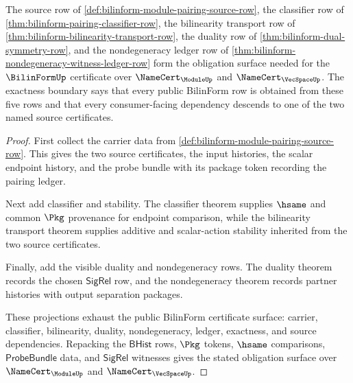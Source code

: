 \begin{theorem}
\label{thm:bilinform-exactness-dependency-row}
The source row of \autoref{def:bilinform-module-pairing-source-row}, the
classifier row of \autoref{thm:bilinform-pairing-classifier-row}, the
bilinearity transport row of
\autoref{thm:bilinform-bilinearity-transport-row}, the duality row of
\autoref{thm:bilinform-dual-symmetry-row}, and the nondegeneracy ledger row
of \autoref{thm:bilinform-nondegeneracy-witness-ledger-row} form the
obligation surface needed for the $\BilinFormUp$ certificate over
$\NameCert_{\ModuleUp}$ and $\NameCert_{\VecSpaceUp}$. The exactness boundary
says that every public BilinForm row is obtained from these five rows and
that every consumer-facing dependency descends to one of the two named source
certificates.
\end{theorem}
\begin{proof}
First collect the carrier data from
\autoref{def:bilinform-module-pairing-source-row}. This gives the two source
certificates, the input histories, the scalar endpoint history, and the
probe bundle with its package token recording the pairing ledger.

Next add classifier and stability. The classifier theorem supplies $\hsame$
and common $\Pkg$ provenance for endpoint comparison, while the bilinearity
transport theorem supplies additive and scalar-action stability inherited
from the two source certificates.

Finally, add the visible duality and nondegeneracy rows. The duality theorem
records the chosen $\mathsf{SigRel}$ row, and the nondegeneracy theorem
records partner histories with output separation packages.

These projections exhaust the public BilinForm certificate surface: carrier,
classifier, bilinearity, duality, nondegeneracy, ledger, exactness, and source
dependencies. Repacking the $\mathsf{BHist}$ rows, $\Pkg$ tokens, $\hsame$
comparisons, $\mathsf{ProbeBundle}$ data, and $\mathsf{SigRel}$ witnesses
gives the stated obligation surface over $\NameCert_{\ModuleUp}$ and
$\NameCert_{\VecSpaceUp}$.
\end{proof}

